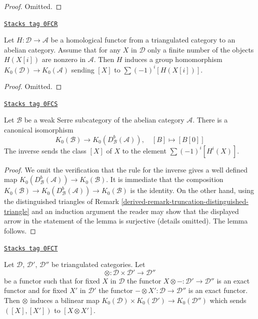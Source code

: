 \begin{proof}
Omitted.
\end{proof}

\begin{lemma}
\label{derived-lemma-homological-map-K}
\href{https://stacks.math.columbia.edu/tag/0FCR}{\texttt{Stacks tag 0FCR}}

Let $H : \mathcal{D} \to \mathcal{A}$ be a homological functor
from a triangulated category to an abelian category. Assume that
for any $X$ in $\mathcal{D}$ only a finite number of the objects
$H(X[i])$ are nonzero in $\mathcal{A}$. Then $H$ induces a group homomorphism
$K_0(\mathcal{D}) \to K_0(\mathcal{A})$ sending $[X]$ to
$\sum (-1)^i[H(X[i])]$.
\end{lemma}

\begin{proof}
Omitted.
\end{proof}

\begin{lemma}
\label{derived-lemma-DBA-map-K}
\href{https://stacks.math.columbia.edu/tag/0FCS}{\texttt{Stacks tag 0FCS}}

Let $\mathcal{B}$ be a weak Serre subcategory of the abelian category
$\mathcal{A}$. There is a canonical isomorphism
$$
K_0(\mathcal{B}) \longrightarrow
K_0(D^b_\mathcal{B}(\mathcal{A})),\quad
[B] \longmapsto [B[0]]
$$
The inverse sends the class $[X]$ of $X$
to the element $\sum (-1)^i[H^i(X)]$.
\end{lemma}

\begin{proof}

We omit the verification that the rule for the inverse gives a well defined
map $K_0(D^b_\mathcal{B}(\mathcal{A})) \to K_0(\mathcal{B})$.
It is immediate that the composition
$K_0(\mathcal{B}) \to
K_0(D^b_\mathcal{B}(\mathcal{A})) \to
K_0(\mathcal{B})$ is the identity. On the other hand, using the
distinguished triangles of
Remark \ref{derived-remark-truncation-distinguished-triangle} and an
induction argument the reader may show that the displayed arrow
in the statement of the lemma is surjective (details omitted).
The lemma follows.
\end{proof}

\begin{lemma}
\label{derived-lemma-bilinear-map-K}
\href{https://stacks.math.columbia.edu/tag/0FCT}{\texttt{Stacks tag 0FCT}}

Let $\mathcal{D}$, $\mathcal{D}'$, $\mathcal{D}''$ be triangulated categories.
Let
$$
\otimes : \mathcal{D} \times \mathcal{D}' \longrightarrow \mathcal{D}''
$$
be a functor such that for fixed $X$ in $\mathcal{D}$ the functor
$X \otimes - : \mathcal{D}' \to \mathcal{D}''$ is an exact functor and
for fixed $X'$ in $\mathcal{D}'$ the functor
$- \otimes X' : \mathcal{D} \to \mathcal{D}''$ is an exact functor. Then
$\otimes$ induces a bilinear map
$K_0(\mathcal{D}) \times K_0(\mathcal{D}') \to K_0(\mathcal{D}'')$
which sends $([X], [X'])$ to $[X \otimes X']$.
\end{lemma}

